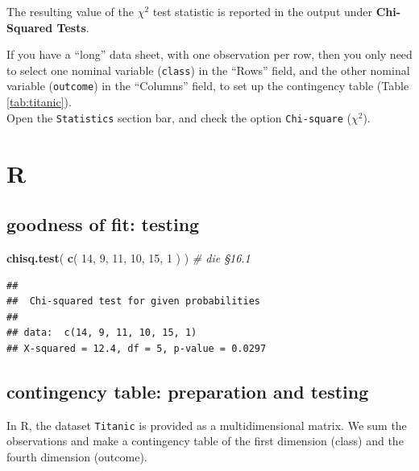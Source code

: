 \documentclass[
]{book}
\newenvironment{Shaded}{\begin{snugshade}}{\end{snugshade}}
\newcommand{\CommentTok}[1]{\textcolor[rgb]{0.56,0.35,0.01}{\textit{#1}}}
\newcommand{\DecValTok}[1]{\textcolor[rgb]{0.00,0.00,0.81}{#1}}
\newcommand{\KeywordTok}[1]{\textcolor[rgb]{0.13,0.29,0.53}{\textbf{#1}}}
\newcommand{\NormalTok}[1]{#1}
\begin{document}
The resulting value of the \(\chi^2\) test statistic is reported in the output under \textbf{Chi-Squared Tests}.

If you have a ``long'' data sheet, with one observation per row, then you only need to select one nominal variable (\texttt{class}) in the ``Rows'' field, and the other nominal variable (\texttt{outcome}) in the ``Columns'' field, to set up the contingency table (Table \ref{tab:titanic}).\\
Open the \texttt{Statistics} section bar, and check the option \texttt{Chi-square} (\(\chi^2\)).

\hypertarget{r-16}{%
\section{R}\label{r-16}}

\hypertarget{goodness-of-fit-testing-2}{%
\subsection{goodness of fit: testing}\label{goodness-of-fit-testing-2}}

\begin{Shaded}
\begin{Highlighting}[]
\KeywordTok{chisq.test}\NormalTok{( }\KeywordTok{c}\NormalTok{( }\DecValTok{14}\NormalTok{, }\DecValTok{9}\NormalTok{, }\DecValTok{11}\NormalTok{, }\DecValTok{10}\NormalTok{, }\DecValTok{15}\NormalTok{, }\DecValTok{1}\NormalTok{ ) ) }\CommentTok{\# die §16.1}
\end{Highlighting}
\end{Shaded}

\begin{verbatim}
## 
##  Chi-squared test for given probabilities
## 
## data:  c(14, 9, 11, 10, 15, 1)
## X-squared = 12.4, df = 5, p-value = 0.0297
\end{verbatim}

\hypertarget{contingency-table-preparation-and-testing}{%
\subsection{contingency table: preparation and testing}\label{contingency-table-preparation-and-testing}}

In R, the dataset \texttt{Titanic} is provided as a multidimensional matrix. We sum
the observations and make a contingency table of the first dimension (class) and
the fourth dimension (outcome).
\end{document}
